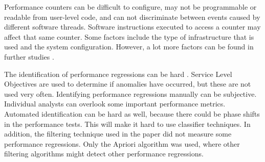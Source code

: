 Performance counters can be difficult to configure, may not be programmable or readable from user-level code, and can not discriminate between events caused by different software threads. Software instructions executed to access a counter may affect that same counter. Some factors include the type of infrastructure that is used and the system configuration. However, a lot more factors can be found in further studies \cite{AccuracyPerformanceCounter}.

The identification of performance regressions can be hard \cite{foo2010mining}. Service Level Objectives are used to determine if anomalies have occurred, but these are not used very often. Identifying performance regressions manually can be subjective. Individual analysts can overlook some important performance metrics. Automated identification can be hard as well, because there could be phase shifts in the performance tests. This will make it hard to use classifier techniques.
In addition, the filtering technique used in the paper did not measure some performance regressions. Only the Apriori algorithm was used, where other filtering algorithms might detect other performance regressions.


